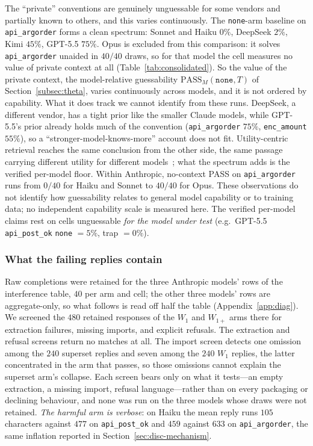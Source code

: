 \documentclass[11pt]{article}
\theoremstyle{plain}
\theoremstyle{definition}
\theoremstyle{remark}
\newcommand{\PASS}{\mathrm{PASS}}
\begin{document}
The ``private'' conventions are genuinely unguessable for some vendors and partially known to others,
and this varies continuously. The \texttt{none}-arm baseline on \texttt{api\_argorder} forms a clean
spectrum: Sonnet and Haiku $0\%$, DeepSeek $2\%$, Kimi $45\%$, GPT-5.5 $75\%$. Opus is
excluded from this comparison: it solves \texttt{api\_argorder} unaided in $40/40$ draws, so
for that model the cell measures no value of private context at all
(Table~\ref{tab:consolidated}). So the value of the private context, the
model-relative guessability $\PASS_M(\texttt{none},T)$ of Section~\ref{subsec:theta}, varies continuously across
models, and it is not ordered by capability. What it does track we cannot identify from these
runs. DeepSeek, a different vendor,
has a tight prior like the smaller Claude models, while GPT-5.5's prior already holds much of the
convention (\texttt{api\_argorder} $75\%$, \texttt{enc\_amount} $55\%$), so a
``stronger-model-knows-more'' account does not fit. Utility-centric retrieval reaches the same
conclusion from the other side, the same passage carrying different utility for different
models~\citep{zhang2025llmutility}; what the spectrum adds is the verified per-model floor. Within
Anthropic, no-context PASS on \texttt{api\_argorder} runs from $0/40$ for Haiku and Sonnet to
$40/40$ for Opus. These observations do not identify how guessability relates to general model
capability or to training data; no independent capability scale is measured here. The verified per-model claims rest on cells unguessable \emph{for the model under test}
(e.g.\ GPT-5.5 \texttt{api\_post\_ok} \texttt{none} $= 5\%$, trap $= 0\%$).

\subsubsection{What the failing replies contain}
\label{sec:results-audit}


Raw completions were retained for the three Anthropic models' rows of the interference table,
$40$ per arm and cell; the other three models' rows are aggregate-only, so what follows is read
off half the table (Appendix~\ref{app:diag}). We screened the $480$ retained responses of the
$W_1$ and $W_{1+}$ arms there for extraction failures, missing imports, and explicit refusals.
The extraction and refusal screens return no matches at all. The import screen detects one omission among the $240$ superset
replies and seven among the $240$ $W_1$ replies, the latter concentrated in the arm that passes,
so those omissions cannot explain the superset arm's collapse. Each screen bears only on what it
tests---an empty extraction, a missing import, refusal language---rather than on every packaging
or declining behaviour, and none was run on the three models whose draws were not retained. \emph{The harmful arm is verbose}: on Haiku the mean reply runs $105$
characters against $477$ on \texttt{api\_post\_ok} and $459$ against $633$ on
\texttt{api\_argorder}, the same inflation reported in Section~\ref{sec:disc-mechanism}.
\end{document}
